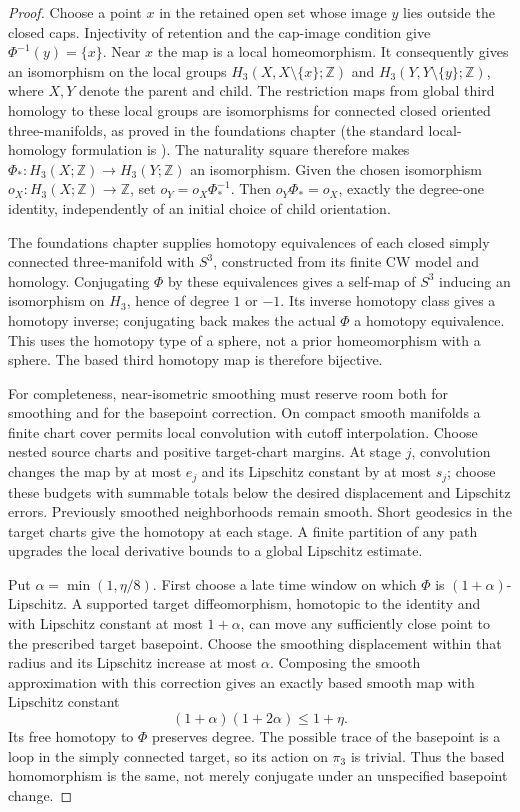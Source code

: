 \begin{proof}
Choose a point $x$ in the retained open set whose image $y$ lies outside
the closed caps.  Injectivity of retention and the cap-image condition
give $\Phi^{-1}(y)=\{x\}$.  Near $x$ the map is a local homeomorphism.
It consequently gives an isomorphism on the local groups
$H_3(X,X\setminus\{x\};\mathbb Z)$ and
$H_3(Y,Y\setminus\{y\};\mathbb Z)$, where $X,Y$ denote the parent
and child.  The restriction maps from global third homology to these
local groups are isomorphisms for connected closed oriented
three-manifolds, as proved in the foundations chapter
(the standard local-homology formulation is
\cite[Theorem 3.26(a), pp. 236--238]{Hatcher}).
The naturality square therefore makes
$\Phi_*:H_3(X;\mathbb Z)\to H_3(Y;\mathbb Z)$ an isomorphism.
Given the chosen isomorphism $o_X:H_3(X;\mathbb Z)\to\mathbb Z$,
set $o_Y=o_X\Phi_*^{-1}$.  Then $o_Y\Phi_*=o_X$, exactly the
degree-one identity, independently of an initial choice of child
orientation.

The foundations chapter supplies homotopy equivalences of each closed
simply connected three-manifold with $S^3$, constructed from its finite
CW model and homology.  Conjugating $\Phi$ by these equivalences gives
a self-map of $S^3$ inducing an isomorphism on $H_3$, hence of degree
$1$ or $-1$.  Its inverse homotopy class gives a homotopy inverse;
conjugating back makes the actual $\Phi$ a homotopy equivalence.
This uses the homotopy type of a sphere, not a prior homeomorphism
with a sphere.  The based third homotopy map is therefore bijective.

For completeness, near-isometric smoothing must reserve room both
for smoothing and for the basepoint correction.  On compact smooth
manifolds a finite chart cover permits local convolution with cutoff
interpolation.  Choose nested source charts and positive target-chart
margins.  At stage $j$, convolution changes the map by at most $e_j$
and its Lipschitz constant by at most $s_j$; choose these budgets with
summable totals below the desired displacement and Lipschitz errors.
Previously smoothed neighborhoods remain smooth.  Short geodesics in
the target charts give the homotopy at each stage.  A finite partition
of any path upgrades the local derivative bounds to a global
Lipschitz estimate.

Put $\alpha=\min(1,\eta/8)$.  First choose a late time window on
which $\Phi$ is $(1+\alpha)$-Lipschitz.  A supported target
diffeomorphism, homotopic to the identity and with Lipschitz constant
at most $1+\alpha$, can move any sufficiently close point to the
prescribed target basepoint.  Choose the smoothing displacement within
that radius and its Lipschitz increase at most $\alpha$.  Composing
the smooth approximation with this correction gives an exactly based
smooth map with Lipschitz constant
\[
 (1+\alpha)(1+2\alpha)\leq1+\eta.
\]
Its free homotopy to $\Phi$ preserves degree.  The possible trace
of the basepoint is a loop in the simply connected target, so its
action on $\pi_3$ is trivial.  Thus the based homomorphism is the
same, not merely conjugate under an unspecified basepoint change.
\end{proof}

